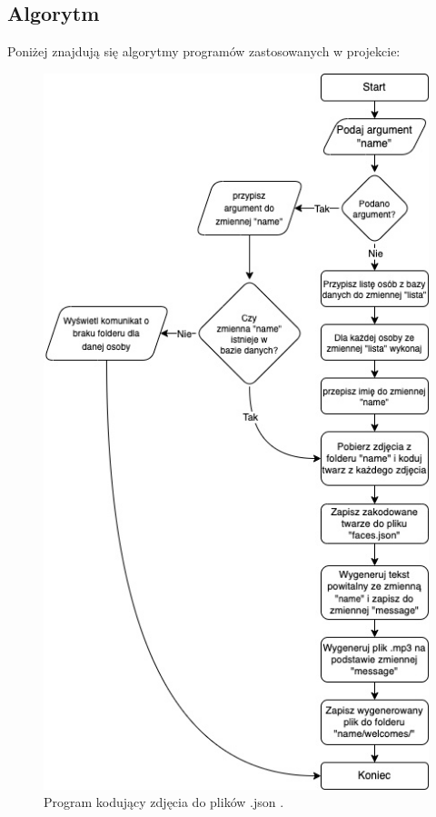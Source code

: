 \documentclass[a4paper,12pt,reqno]{article}
\begin{document}
\newpage
\subsection{Algorytm}
Poniżej znajdują się algorytmy programów zastosowanych w projekcie:

\begin{figure}[H]%
\centering
\includegraphics[width=0.7\columnwidth]{imgs/generujacy.drawio.jpg}
\caption{Program kodujący zdjęcia do plików .json \cite{img_me}. \label{algorytm_encode_faces}}
\quad
\end{figure}
\end{document}
